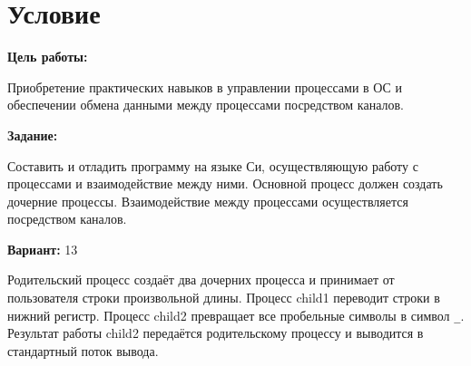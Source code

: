 \section{Условие}

{\bfseries Цель работы:}

Приобретение практических навыков в управлении процессами в ОС и
обеспечении обмена данными между процессами посредством каналов.

{\bfseries Задание:}

Составить и отладить программу на языке Си, осуществляющую работу с
процессами и взаимодействие между ними. Основной процесс должен создать
дочерние процессы. Взаимодействие между процессами осуществляется
посредством каналов.

{\bfseries Вариант:} 13

Родительский процесс создаёт два дочерних процесса и принимает от
пользователя строки произвольной длины. Процесс child1 переводит строки
в нижний регистр. Процесс child2 превращает все пробельные символы
в символ \texttt{\_}. Результат работы child2 передаётся родительскому
процессу и выводится в стандартный поток вывода.
